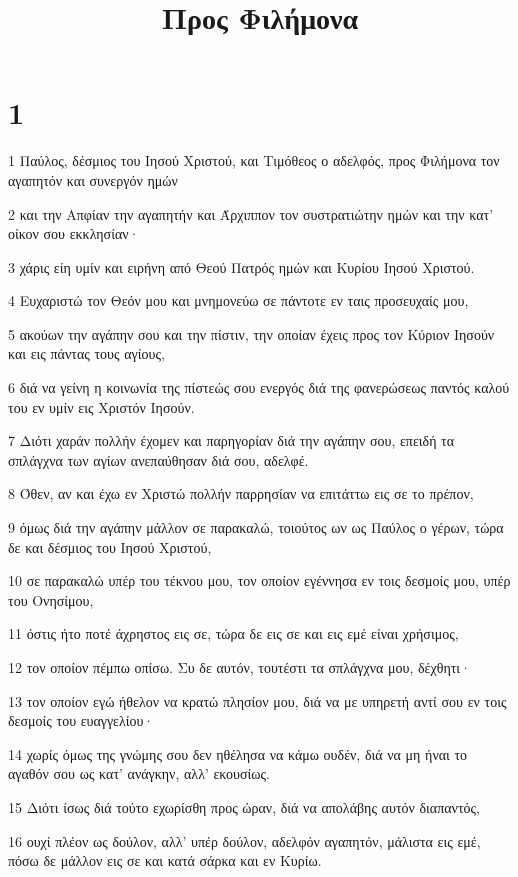 

\title{Προς Φιλήμονα}


\chapter{1}

\par 1 Παύλος, δέσμιος του Ιησού Χριστού, και Τιμόθεος ο αδελφός, προς Φιλήμονα τον αγαπητόν και συνεργόν ημών
\par 2 και την Απφίαν την αγαπητήν και Άρχιππον τον συστρατιώτην ημών και την κατ' οίκον σου εκκλησίαν·
\par 3 χάρις είη υμίν και ειρήνη από Θεού Πατρός ημών και Κυρίου Ιησού Χριστού.
\par 4 Ευχαριστώ τον Θεόν μου και μνημονεύω σε πάντοτε εν ταις προσευχαίς μου,
\par 5 ακούων την αγάπην σου και την πίστιν, την οποίαν έχεις προς τον Κύριον Ιησούν και εις πάντας τους αγίους,
\par 6 διά να γείνη η κοινωνία της πίστεώς σου ενεργός διά της φανερώσεως παντός καλού του εν υμίν εις Χριστόν Ιησούν.
\par 7 Διότι χαράν πολλήν έχομεν και παρηγορίαν διά την αγάπην σου, επειδή τα σπλάγχνα των αγίων ανεπαύθησαν διά σου, αδελφέ.
\par 8 Όθεν, αν και έχω εν Χριστώ πολλήν παρρησίαν να επιτάττω εις σε το πρέπον,
\par 9 όμως διά την αγάπην μάλλον σε παρακαλώ, τοιούτος ων ως Παύλος ο γέρων, τώρα δε και δέσμιος του Ιησού Χριστού,
\par 10 σε παρακαλώ υπέρ του τέκνου μου, τον οποίον εγέννησα εν τοις δεσμοίς μου, υπέρ του Ονησίμου,
\par 11 όστις ήτο ποτέ άχρηστος εις σε, τώρα δε εις σε και εις εμέ είναι χρήσιμος,
\par 12 τον οποίον πέμπω οπίσω. Συ δε αυτόν, τουτέστι τα σπλάγχνα μου, δέχθητι·
\par 13 τον οποίον εγώ ήθελον να κρατώ πλησίον μου, διά να με υπηρετή αντί σου εν τοις δεσμοίς του ευαγγελίου·
\par 14 χωρίς όμως της γνώμης σου δεν ηθέλησα να κάμω ουδέν, διά να μη ήναι το αγαθόν σου ως κατ' ανάγκην, αλλ' εκουσίως.
\par 15 Διότι ίσως διά τούτο εχωρίσθη προς ώραν, διά να απολάβης αυτόν διαπαντός,
\par 16 ουχί πλέον ως δούλον, αλλ' υπέρ δούλον, αδελφόν αγαπητόν, μάλιστα εις εμέ, πόσω δε μάλλον εις σε και κατά σάρκα και εν Κυρίω.
